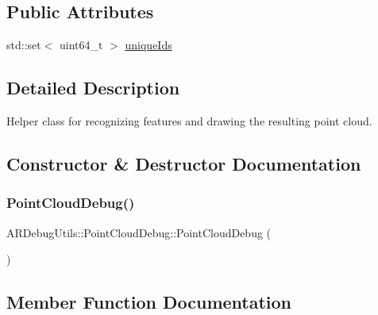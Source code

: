 \subsection*{Public Attributes}
\begin{DoxyCompactItemize}
\item 
std\+::set$<$ uint64\+\_\+t $>$ \hyperlink{class_a_r_debug_utils_1_1_point_cloud_debug_a6405deec8e383af9b59593e7e207d1cf}{unique\+Ids}
\end{DoxyCompactItemize}


\subsection{Detailed Description}
Helper class for recognizing features and drawing the resulting point cloud. 

\subsection{Constructor \& Destructor Documentation}
\mbox{\label{class_a_r_debug_utils_1_1_point_cloud_debug_a7de6576b45c662cddc632e7b9d7c9bd7}} 
\subsubsection{\texorpdfstring{Point\+Cloud\+Debug()}{PointCloudDebug()}}
{\footnotesize\ttfamily A\+R\+Debug\+Utils\+::\+Point\+Cloud\+Debug\+::\+Point\+Cloud\+Debug (\begin{DoxyParamCaption}{ }\end{DoxyParamCaption})\hspace{0.3cm}{\ttfamily [inline]}}



\subsection{Member Function Documentation}
\mbox{\label{class_a_r_debug_utils_1_1_point_cloud_debug_a308b87459dd4f0fc89f25bc65ad7b383}} 
